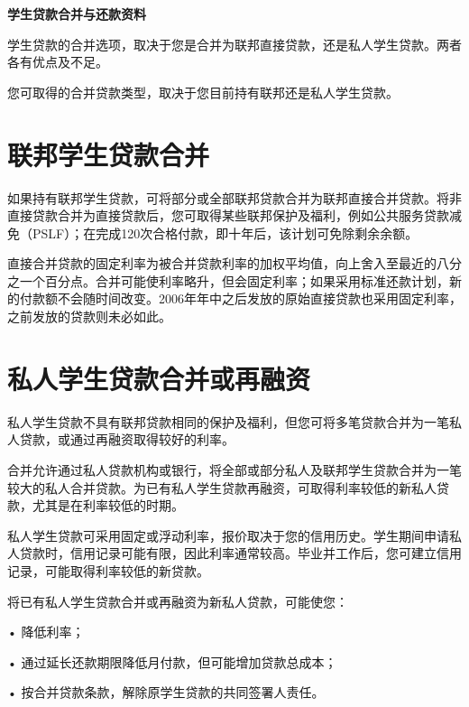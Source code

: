 \documentclass[UTF8,fontset=none,11pt,a4paper]{ctexart}
\begin{document}
{\noindent\fontsize{20}{25}\selectfont\bfseries 学生贷款合并与还款资料\par}
\vspace{10pt}
学生贷款的合并选项，取决于您是合并为联邦直接贷款，还是私人学生贷款。两者各有优\allowbreak\mbox{点及不足。}


您可取得的合并贷款类型，取决于您目前持有联邦还是私人\allowbreak\mbox{学生贷款。}


\section*{联邦学生贷款合并}
如果持有联邦学生贷款，可将部分或全部联邦贷款合并为联邦直接合并贷款。将非直接贷款合并为直接贷款后，您可取得某些联邦保护及福利，例如公共服务贷款减免（PSLF）；在完成120次合格付款，即十年后，该计划可免除\allowbreak\mbox{剩余余额。}


直接合并贷款的固定利率为被合并贷款利率的加权平均值，向上舍入至最近的八分之一个百分点。合并可能使利率略升，但会固定利率；如果采用标准还款计划，新的付款额不会随时间改变。2006年年中之后发放的原始直接贷款也采用固定利率，之前发放的贷款则\allowbreak\mbox{未必如此。}


\section*{私人学生贷款合并或再融资}
私人学生贷款不具有联邦贷款相同的保护及福利，但您可将多笔贷款合并为一笔私人贷款，或通过再融资取得较\allowbreak\mbox{好的利率。}


合并允许通过私人贷款机构或银行，将全部或部分私人及联邦学生贷款合并为一笔较大的私人合并贷款。为已有私人学生贷款再融资，可取得利率较低的新私人贷款，尤其是在利率较\allowbreak\mbox{低的时期。}


私人学生贷款可采用固定或浮动利率，报价取决于您的信用历史。学生期间申请私人贷款时，信用记录可能有限，因此利率通常较高。毕业并工作后，您可建立信用记录，可能取得利率较低\allowbreak\mbox{的新贷款。}


将已有私人学生贷款合并或再融资为新私人贷款，\allowbreak\mbox{可能使您：}


• \allowbreak\mbox{降低利率；}


• 通过延长还款期限降低月付款，但可能增加贷\allowbreak\mbox{款总成本；}


• 按合并贷款条款，解除原学生贷款的共同签\allowbreak\mbox{署人责任。}
\end{document}

